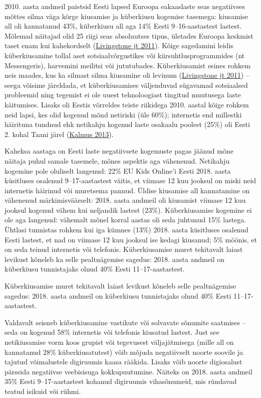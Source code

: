 \documentclass[estonian,]{article}
\begin{document}
2010. aasta andmeil paistsid Eesti lapsed Euroopa eakaaslaste seas negatiivses mõttes silma väga kõrge kiusamise ja küberkiusu kogemise tasemega: kiusamise all oli kannatanud 43\%, küberkiusu all aga 14\% Eesti 9--16-aastastest lastest. Mõlemad näitajad olid 25 riigi seas absoluutses tipus, ületades Euroopa keskmist taset enam kui kahekordselt (\protect\hyperlink{Livingstone2011}{Livingstone jt 2011}). Kõige sagedamini leidis küberkiusamine tollal aset sotsiaalvõrgustikes või kiirsuhtlusprogrammides (nt Messengeris), harvemini meilitsi või jututubades. Küberkiusamist esines rohkem neis maades, kus ka silmast silma kiusamine oli levinum (\protect\hyperlink{Livingstone2011}{Livingstone jt 2011}) -- seega võisime järeldada, et küberkiusamises väljenduvad sügavamad sotsiaalsed probleemid ning tegemist ei ole uuest tehnoloogiast tingitud muutusega laste käitumises. Lisaks oli Eestis võrreldes teiste riikidega 2010. aastal kõige rohkem neid lapsi, kes olid kogenud mõnd netiriski (üle 60\%); internetis end millestki häirituna tundnud ehk netikahju kogenud laste osakaalu poolest (25\%) oli Eesti 2. kohal Taani järel (\protect\hyperlink{Kalmus2013}{Kalmus 2013}).

Kaheksa aastaga on Eesti laste negatiivsete kogemuste pagas jäänud mõne näitaja puhul samale tasemele, mõnes aspektis aga vähenenud. Netikahju kogemine pole oluliselt langenud: 22\% EU Kids Online'i Eesti 2018. aasta küsitluses osalenud 9--17-aastastest väitis, et viimase 12 kuu jooksul on miski neid internetis häirinud või muretsema pannud. Üldise kiusamise all kannatamine on vähenenud märkimisväärselt: 2018. aasta andmeil oli kiusamist viimase 12 kuu jooksul kogenud vähem kui neljandik lastest (23\%). Küberkiusamise kogemine ei ole aga langenud: vähemalt mõnel korral aastas oli seda juhtunud 15\% lastega.
Ühtlasi tunnistas rohkem kui iga kümnes (13\%) 2018. aasta küsitluses osalenud Eesti lastest, et nad on viimase 12 kuu jooksul ise kedagi kiusanud; 5\% möönis, et on seda teinud internetis või telefonis. Küberkiusamise muret tekitavalt laiast levikust kõneleb ka selle pealtnägemise sagedus: 2018. aasta andmeil on küberkiusu tunnistajaks olnud 40\% Eesti 11--17-aastastest.

\begin{blockquote-left}
Küberkiusamise muret tekitavalt laiast levikust kõneleb selle
pealtnägemise sagedus: 2018. aasta andmeil on küberkiusu tunnistajaks
olnud 40\% Eesti 11--17-aastastest.
\end{blockquote-left}

Valdavalt seisneb küberkiusamine vastikute või solvavate sõnumite saatmises -- seda on kogenud 58\% internetis või telefonis kiusatud lastest. Just see netikiusamise vorm koos grupist või tegevusest väljajätmisega (mille all on kannatanud 28\% küberkiusatutest) võib mõjuda negatiivselt noorte soovile ja tajutud võimalustele digiruumis kaasa rääkida. Lisaks võib noorte digiosalust pärssida negatiivse veebisisuga kokkupuutumine. Näiteks on 2018. aasta andmeil 35\% Eesti 9--17-aastastest kohanud digiruumis vihasõnumeid, mis ründavad teatud isikuid või rühmi.
\end{document}
